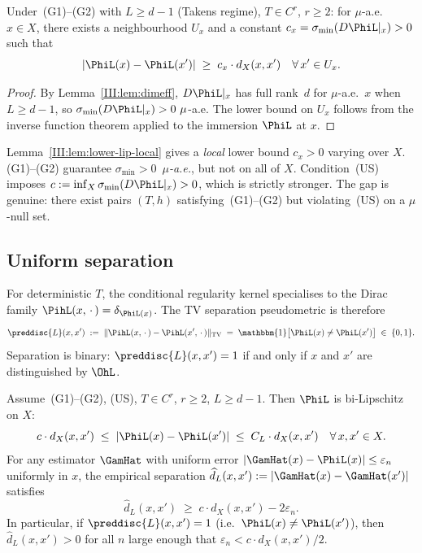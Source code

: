 \begin{lemma}
\label{III:lem:lower-lip-local}
Under~(G1)--(G2) with $L \geq d-1$ (Takens regime), $T \in C^r$, $r \geq 2$:
for $\mu$-a.e.\ $x \in X$, there exists a neighbourhood $U_x$ and a constant
$c_x = \sigma_{\min}(D\PhiL|_x) > 0$ such that
\[
  |\PhiL(x) - \PhiL(x')| \;\geq\; c_x \cdot d_X(x,x')
  \quad\forall\, x' \in U_x.
\]
\end{lemma}

\begin{proof}
By Lemma~\ref{III:lem:dimeff}, $D\PhiL|_x$ has full rank~$d$ for $\mu$-a.e.\ $x$
when $L \geq d-1$, so $\sigma_{\min}(D\PhiL|_x) > 0~\mu$-a.e.
The lower bound on $U_x$ follows from the inverse function theorem applied to
the immersion $\PhiL$ at $x$.
\end{proof}

\begin{remark}
Lemma~\ref{III:lem:lower-lip-local} gives a \emph{local} lower bound $c_x > 0$
varying over $X$.
(G1)--(G2) guarantee $\sigma_{\min} > 0$~\emph{$\mu$-a.e.}, but not on all of $X$.
Condition~(US) imposes $c := \inf_X \sigma_{\min}(D\PhiL|_x) > 0$, which is
strictly stronger.
The gap is genuine: there exist pairs $(T,h)$ satisfying~(G1)--(G2) but
violating~(US) on a $\mu$-null set.
\end{remark}

\subsection{Uniform separation}

For deterministic $T$, the conditional regularity kernel specialises to the
Dirac family $\PihL(x,\,\cdot\,) = \delta_{\PhiL(x)}$.
The TV separation pseudometric is therefore
\[
  \preddisc{L}(x,x')
  \;:=\;
  \|\PihL(x,\,\cdot\,) - \PihL(x',\,\cdot\,)\|_{\mathrm{TV}}
  \;=\;
  \mathbbm{1}\bigl[\PhiL(x) \neq \PhiL(x')\bigr]
  \;\in\; \{0,1\}.
\]
Separation is binary: $\preddisc{L}(x,x') = 1$ if and only if
$x$ and $x'$ are distinguished by $\OhL$.

\begin{theorem}
\label{III:thm:sep-stable}
Assume~(G1)--(G2), (US), $T \in C^r$, $r \geq 2$, $L \geq d-1$.
Then $\PhiL$ is bi-Lipschitz on $X$:
\[
  c \cdot d_X(x,x') \;\leq\; |\PhiL(x) - \PhiL(x')| \;\leq\; C_L \cdot d_X(x,x')
  \quad\forall\, x, x' \in X.
\]
For any estimator $\GamHat$ with uniform error
$|\GamHat(x) - \PhiL(x)| \leq \varepsilon_n$ uniformly in $x$, the
empirical separation $\widehat{d}_L(x,x') := |\GamHat(x) - \GamHat(x')|$
satisfies
\[
  \widehat{d}_L(x,x') \;\geq\; c \cdot d_X(x,x') - 2\varepsilon_n.
\]
In particular, if $\preddisc{L}(x,x') = 1$ (i.e.\ $\PhiL(x) \neq \PhiL(x')$),
then $\widehat{d}_L(x,x') > 0$ for all $n$ large enough that
$\varepsilon_n < c \cdot d_X(x,x') / 2$.
\end{theorem}

